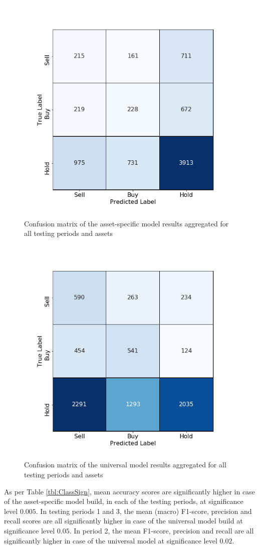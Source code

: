 \documentclass[12pt, a4paper]{article}
\begin{document}
\begin{figure}[H]
    \centering
    \includegraphics[width=.62\textwidth]{images/CMs/CM_indiv_aggreg.png}
    \caption{Confusion matrix of the asset-specific model results aggregated for all testing periods and assets}
    \label{fig:CMAggrI}
\end{figure}

\begin{figure}[H]
    \centering
    \includegraphics[width=.62\textwidth]{images/CMs/CM_univ_aggreg.png}
    \caption{Confusion matrix of the universal model results aggregated for all testing periods and assets}
    \label{fig:CMAggrU}
\end{figure}

As per Table \ref{tbl:ClassSign}, mean accuracy scores are significantly higher in case of the asset-specific model build, in each of the testing periods, at significance level $0.005$. In testing periods 1 and 3, the mean (macro) F1-score, precision and recall scores are all significantly higher in case of the universal model build at significance level $0.05$. In period 2, the mean F1-score, precision and recall are all significantly higher in case of the universal model at significance level $0.02$. 
\end{document}
